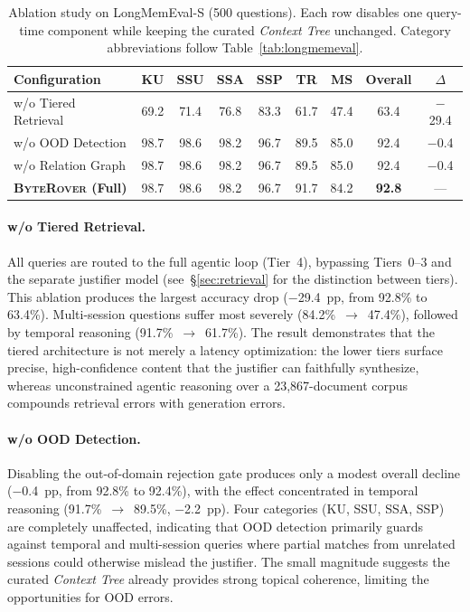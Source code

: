 \documentclass[11pt]{article}
\newcommand{\byterover}{\textsc{ByteRover}}
\newcommand{\contexttree}{\textit{Context Tree}}
\begin{document}
\begin{table}[t]
\centering
\small
\begin{tabular}{@{}lcccccc|cc@{}}
\toprule
\textbf{Configuration} & \textbf{KU} & \textbf{SSU} & \textbf{SSA} & \textbf{SSP} & \textbf{TR} & \textbf{MS} & \textbf{Overall} & \textbf{$\Delta$} \\
\midrule
w/o Tiered Retrieval   & 69.2 & 71.4 & 76.8 & 83.3 & 61.7 & 47.4 & 63.4 & $-$29.4 \\
w/o OOD Detection      & 98.7 & 98.6 & 98.2 & 96.7 & 89.5 & 85.0 & 92.4 & $-$0.4 \\
w/o Relation Graph     & 98.7 & 98.6 & 98.2 & 96.7 & 89.5 & 85.0 & 92.4 & $-$0.4 \\
\midrule
\textbf{\byterover{} (Full)} & 98.7 & 98.6 & 98.2 & 96.7 & 91.7 & 84.2 & \textbf{92.8} & --- \\
\bottomrule
\end{tabular}
\caption{Ablation study on LongMemEval-S (500 questions).
  Each row disables one query-time component while keeping the curated
  \contexttree{} unchanged.
  Category abbreviations follow Table~\ref{tab:longmemeval}.}
\label{tab:ablation}
\end{table}

\paragraph{w/o Tiered Retrieval.}
All queries are routed to the full agentic loop (Tier~4),
bypassing Tiers~0--3 and the separate justifier model
(see~\S\ref{sec:retrieval} for the distinction between tiers).
This ablation produces the largest accuracy drop ($-$29.4~pp, from 92.8\% to 63.4\%).
Multi-session questions suffer most severely (84.2\%~$\to$~47.4\%),
followed by temporal reasoning (91.7\%~$\to$~61.7\%).
The result demonstrates that the tiered architecture is not merely
a latency optimization: the lower tiers surface precise,
high-confidence content that the justifier can faithfully synthesize,
whereas unconstrained agentic reasoning over a 23{,}867-document
corpus compounds retrieval errors with generation errors.

\paragraph{w/o OOD Detection.}
Disabling the out-of-domain rejection gate produces
only a modest overall decline ($-$0.4~pp, from 92.8\% to 92.4\%),
with the effect concentrated in temporal reasoning
(91.7\%~$\to$~89.5\%, $-$2.2~pp).
Four categories (KU, SSU, SSA, SSP) are completely unaffected,
indicating that OOD detection primarily guards against
temporal and multi-session queries where partial matches
from unrelated sessions could otherwise mislead the justifier.
The small magnitude suggests the curated \contexttree{}
already provides strong topical coherence,
limiting the opportunities for OOD errors.
\end{document}
